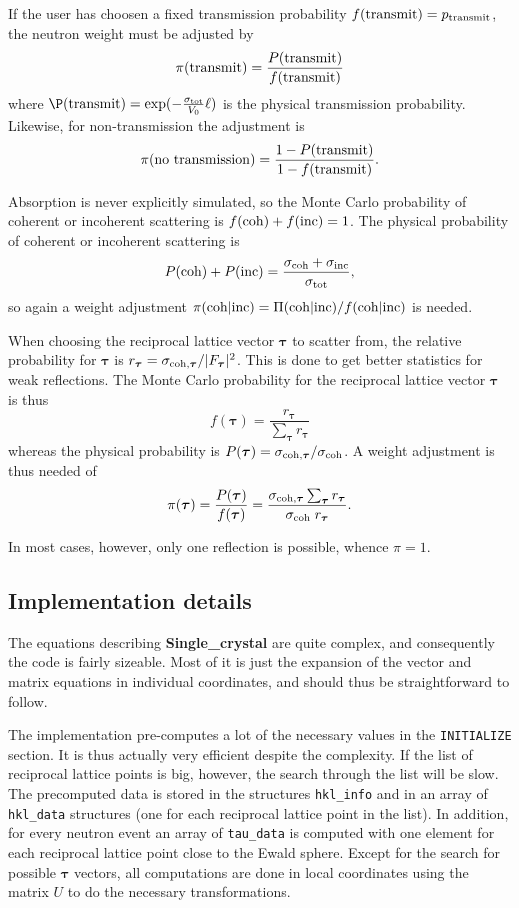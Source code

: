 If the user has choosen a fixed transmission probability $f({\rm
  transmit}) = p_{\rm transmit}$, the neutron weight must be adjusted by
$$ \pi({\rm transmit}) = \frac{P({\rm transmit})}{f({\rm transmit})}
$$
where $\P({\rm transmit}) = \exp(-\frac{\sigma_{\rm tot}}{V_0}\ell)$ is
the physical transmission probability. Likewise, for non-transmission
the adjustment is
$$ \pi({\rm no~transmission}) = \frac{1-P({\rm transmit})}{1-f({\rm transmit})}.
$$

Absorption is never explicitly simulated, so the Monte Carlo probability
of coherent or incoherent scattering is
$f({\rm coh})+f({\rm inc}) = 1$.
The physical probability of coherent or incoherent scattering is
$$ P({\rm coh})+P({\rm inc}) = \frac{\sigma_{\rm coh} + \sigma_{\rm
    inc}}{\sigma_{\rm tot}}, $$
so again a weight adjustment $\pi({\rm coh}|{\rm inc}) = \Pi({\rm
    coh}|{\rm inc})/f({\rm coh}|{\rm inc})$ is needed.

When choosing the reciprocal lattice vector $\boldsymbol{\tau}$ to
scatter from, the relative probability for $\boldsymbol{\tau}$ is
$r_{\boldsymbol{\tau}} = \sigma_{{\rm
    coh},\boldsymbol{\tau}}/|F_{\boldsymbol{\tau}}|^2$. This is done to
get better statistics for weak reflections. The Monte Carlo probability
for the reciprocal lattice vector $\boldsymbol{\tau}$ is thus
$$ f(\boldsymbol{\tau}) =
\frac{r_{\boldsymbol{\tau}}}{\sum_{\boldsymbol{\tau}} r_{\boldsymbol{\tau}}}
$$
whereas the physical probability is $P(\boldsymbol{\tau}) = \sigma_{{\rm
    coh},\boldsymbol{\tau}}/\sigma_{\rm coh}$. A weight adjustment is
thus needed of
$$
\pi(\boldsymbol{\tau}) =
 \frac{P(\boldsymbol{\tau})}{f(\boldsymbol{\tau})} =
 \frac{\sigma_{{\rm coh},\boldsymbol{\tau}}
  \sum_{\boldsymbol{\tau}} r_{\boldsymbol{\tau}}}
 {\sigma_{\rm coh} \; r_{\boldsymbol{\tau}}}.$$

In most cases, however, only one reflection is possible, whence $\pi=1$.

\subsection{Implementation details}
\label{s:Single_crystal_implement}

The equations describing {\bf Single\_crystal} are quite
complex, and consequently the code is fairly sizeable. Most of it is
just the expansion of the vector and matrix equations in individual
coordinates, and should thus be straightforward to follow.

The implementation pre-computes a lot of the necessary values in the
\texttt{INITIALIZE} section. It is thus actually very efficient despite
the complexity. If the list of reciprocal lattice points is big,
however, the search through the list will be slow. The precomputed data
is stored in the structures \texttt{hkl\_info} and in an array of
\texttt{hkl\_data} structures (one for each reciprocal lattice point in
the list). In addition, for every neutron event an array of
\texttt{tau\_data} is computed with one element for each reciprocal
lattice point close to the Ewald sphere. Except for the search for
possible $\boldsymbol{\tau}$ vectors, all computations are done in local
coordinates using the matrix $U$ to do the necessary transformations.

